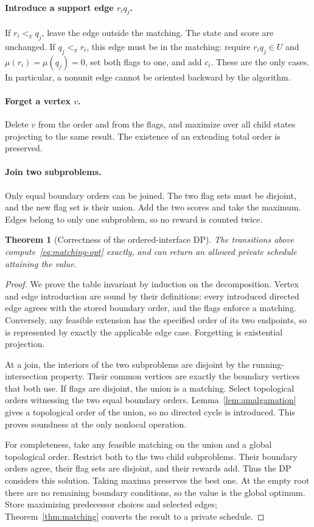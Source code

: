\documentclass[11pt,a4paper]{article}
\newtheorem{theorem}{Theorem}[section]
\theoremstyle{definition}
\theoremstyle{remark}
\begin{document}
\paragraph{Introduce a support edge $r_iq_j$.}
If $r_i<_\pi q_j$, leave the edge outside the matching. The state and
score are unchanged. If $q_j<_\pi r_i$, this edge must be in the matching:
require $r_iq_j\in U$ and $\mu(r_i)=\mu(q_j)=0$, set both flags to one,
and add $c_i$. These are the only cases. In particular, a nonunit edge
cannot be oriented backward by the algorithm.

\paragraph{Forget a vertex $v$.}
Delete $v$ from the order and from the flags, and maximize over all child
states projecting to the same result. The existence of an extending total
order is preserved.

\paragraph{Join two subproblems.}
Only equal boundary orders can be joined. The two flag sets must be
disjoint, and the new flag set is their union. Add the two scores and take
the maximum. Edges belong to only one subproblem, so no reward is counted
twice.

\begin{theorem}[Correctness of the ordered-interface DP]
\label{thm:dp}
The transitions above compute~\eqref{eq:matching-opt} exactly, and can
return an allowed private schedule attaining the value.
\end{theorem}
\begin{proof}
We prove the table invariant by induction on the decomposition.
Vertex and edge introduction are sound by their definitions: every
introduced directed edge agrees with the stored boundary order, and the
flags enforce a matching. Conversely, any feasible extension has the
specified order of its two endpoints, so is represented by exactly the
applicable edge case. Forgetting is existential projection.

At a join, the interiors of the two subproblems are disjoint by the
running-intersection property. Their common vertices are exactly the
boundary vertices that both use. If flags are disjoint, the union is a
matching. Select topological orders witnessing the two equal boundary
orders. Lemma~\ref{lem:amalgamation} gives a topological order of the union,
so no directed cycle is introduced. This proves soundness at the only
nonlocal operation.

For completeness, take any feasible matching on the union and a global
topological order. Restrict both to the two child subproblems. Their
boundary orders agree, their flag sets are disjoint, and their rewards
add. Thus the DP considers this solution. Taking maxima preserves the
best one. At the empty root there are no remaining boundary conditions,
so the value is the global optimum. Store maximizing predecessor choices
and selected edges; Theorem~\ref{thm:matching} converts the result to a
private schedule.
\end{proof}
\end{document}
